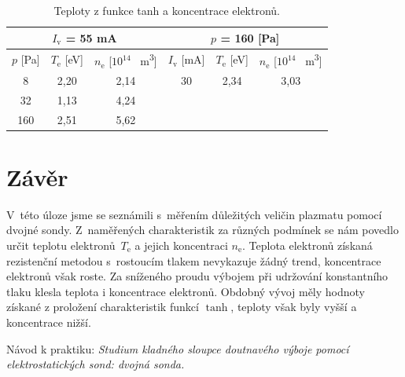 \documentclass[a4paper,12pt]{article}
\begin{document}
\begin{center}
	\begin{table}[h!]
		\centering
		\caption{Teploty z funkce tanh a koncentrace elektronů.}
		\label{tab2}
		\begin{tabular}{|c|c|c|c|c|c|} \hline
			\multicolumn{3}{|c|}{$I_\text{v}$ = 55 \si{\milli\ampere}}& \multicolumn{3}{c|}{$p$ = 160 [\si{\pascal}] }  \\ \hline
			$p$ [\si{\pascal}] & $T_\text{e}$ [\si{\electronvolt}]  & $n_\text{e}$ [$10^{14}$ \si{\per\meter\cubed}]& $I_\text{v}$ [\si{\milli\ampere}] & $T_\text{e}$ [\si{\electronvolt}] & $n_\text{e}$  [$  10^{14}$ \si{\per\meter\cubed}]\\ \hline
			8 & 2,20 & 2,14 & 30 & 2,34 & 3,03\\ \hline
			32 & 1,13 & 4,24 &  &  &  \\ \hline
			160 & 2,51 &5,62 &  &  &  \\ \hline
			
		\end{tabular}
	\end{table}
\end{center}

\section{Závěr}
V~této úloze jsme se seznámili s~měřením důležitých veličin plazmatu pomocí dvojné sondy.
Z~naměřených charakteristik za různých podmínek se nám povedlo určit teplotu
elektronů~$T_\text{e}$ a jejich koncentraci $n_\text{e}$. Teplota elektronů získaná
rezistenční metodou s~rostoucím tlakem
nevykazuje žádný trend, koncentrace elektronů však roste. Za sníženého proudu výbojem
při udržování konstantního tlaku klesla teplota i koncentrace elektronů. Obdobný vývoj
měly hodnoty získané z proložení charakteristik funkcí $\tanh$, teploty však byly vyšší
a koncentrace nižší.


\begin{thebibliography}{10}
	 Návod k praktiku: \textit{Studium kladného sloupce doutnavého výboje pomocí elektrostatických sond: dvojná sonda.}
	
\end{thebibliography}
\end{document}
